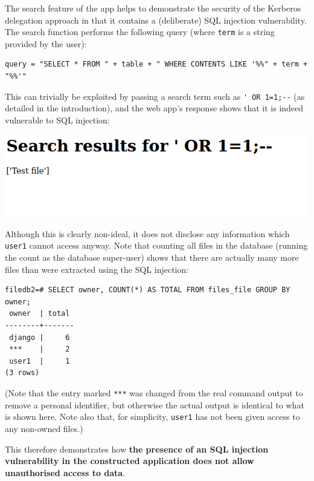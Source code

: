 \documentclass{report}
\begin{document}
The search feature of the app helps to demonstrate the security of the Kerberos delegation approach in that it contains a (deliberate) SQL injection vulnerability. The search function performs the following query (where \texttt{term} is a string provided by the user):

\begin{verbatim}
query = "SELECT * FROM " + table + " WHERE CONTENTS LIKE '%%" + term + "%%'"
\end{verbatim}

This can trivially be exploited by passing a search term such as \verb+' OR 1=1;--+ (as detailed in the introduction), and the web app's response shows that it is indeed vulnerable to SQL injection:

\begin{center}
  \includegraphics[scale=0.5]{08-browser4-sql.png}
\end{center}

Although this is clearly non-ideal, it does not disclose any information which \texttt{user1} cannot access anyway. Note that counting all files in the database (running the count as the database super-user) shows that there are actually many more files than were extracted using the SQL injection:

\begin{verbatim}
filedb2=# SELECT owner, COUNT(*) AS TOTAL FROM files_file GROUP BY owner;
 owner  | total
--------+-------
 django |     6
 ***    |     2
 user1  |     1
(3 rows)
\end{verbatim}

(Note that the entry marked \verb+***+ was changed from the real command output to remove a personal identifier, but otherwise the actual output is identical to what is shown here. Note also that, for simplicity, \texttt{user1} has not been given access to any non-owned files.)

This therefore demonstrates how \textbf{the presence of an SQL injection vulnerability in the constructed application does not allow unauthorised access to data}.
\end{document}
